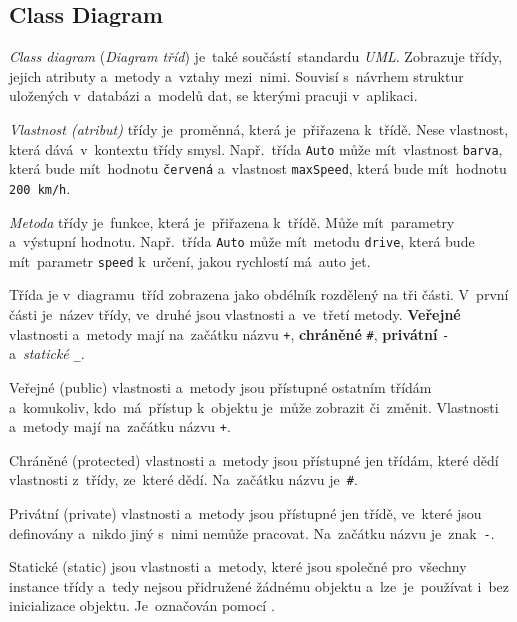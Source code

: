 \documentclass[11pt,a4paper]{report}
\begin{document}
            \subsection{Class Diagram}
                \emph{Class diagram} (\emph{Diagram tříd}) je~také součástí~standardu \emph{UML}. Zobrazuje třídy, jejich atributy a~metody a~vztahy mezi~nimi. Souvisí s~návrhem struktur uložených v~databázi a~modelů dat, se kterými pracuji v~aplikaci.

                \emph{Vlastnost (atribut)} třídy je~proměnná, která je~přiřazena k~třídě. Nese vlastnost, která dává~v~kontextu třídy smysl. Např.~třída \texttt{Auto} může mít~vlastnost \texttt{barva}, která bude mít~hodnotu \texttt{červená} a~vlastnost \texttt{maxSpeed}, která bude mít~hodnotu \texttt{200 km/h}.

                \emph{Metoda} třídy je~funkce, která je~přiřazena k~třídě. Může mít~parametry a~výstupní hodnotu. Např.~třída \texttt{Auto} může mít~metodu \texttt{drive}, která bude mít~parametr \texttt{speed} k~určení, jakou rychlostí má~auto jet.
                
                Třída je v~diagramu~tříd zobrazena jako obdélník rozdělený na tři části. V~první části je~název třídy, ve~druhé jsou vlastnosti a~ve~třetí metody. \textbf{Veřejné} vlastnosti a~metody mají na~začátku názvu \texttt{+}, \textbf{chráněné} \texttt{\#}, \textbf{privátní} \texttt{-} a~\emph{statické} \texttt{\_}.

                \begin{description}
                    \item{Veřejné (public)} vlastnosti a~metody jsou přístupné ostatním třídám a~komukoliv, kdo~má~přístup k~objektu je~může zobrazit či~změnit. Vlastnosti a~metody mají na~začátku názvu \texttt{+}.

                    \item{Chráněné (protected)} vlastnosti a~metody jsou přístupné jen třídám, které dědí vlastnosti z~třídy, ze~které dědí. Na~začátku názvu je~\texttt{\#}.
                
                    \item{Privátní (private)} vlastnosti a~metody jsou přístupné jen třídě, ve~které jsou definovány a~nikdo jiný s~nimi nemůže pracovat. Na~začátku názvu je~znak~\texttt{-}.
                
                    \item{Statické (static)} jsou vlastnosti a~metody, které jsou společné pro~všechny instance třídy a~tedy nejsou přidružené žádnému objektu a~lze~je~používat i~bez inicializace objektu. Je~označován pomocí \texttt{\textunderscore}.
                \end{description}
                
\end{document}

